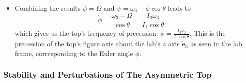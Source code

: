 \documentclass[11pt, a4paper]{article}
\newcommand{\e}{\bm{e}} %
\begin{document}
\begin{itemize}
	\item Combining the results $ \dot \psi = \Omega $ and $ \dot \psi = \omega_{3} - \dot{\phi} \cos \theta $ leads to
	\begin{equation*}
		\dot{\phi} = \frac{\omega_3 - \Omega}{\cos \theta} = \frac{I_{3} \omega_3}{I_1 \cos \theta} 
	\end{equation*}
	which gives us the top's frequency of precession: $ \dot{\phi} = \frac{I_{3}\omega_{3}}{I_{1} \cos \theta} $. This is the precession of the top's figure axis about the lab's $ z $ axis $ \tilde{\e}_{3} $ as seen in the lab frame, corresponding to the Euler angle $ \phi $.
\end{itemize}


\subsubsection{Stability and Perturbations of The Asymmetric Top}
\end{document}
